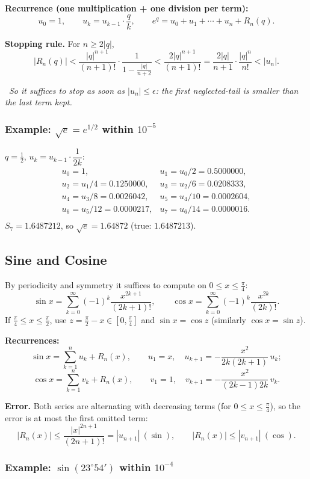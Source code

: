 \documentclass[hidelinks]{article}
\newcommand{\callout}[1]{\par\smallskip\noindent{\color{capri}$\blacktriangleright$}\ \textit{#1}\par\smallskip}
\newcommand{\abs}[1]{\left|#1\right|}
\begin{document}
\textbf{Recurrence (one multiplication + one division per term):}
\[
u_0=1,\qquad u_k=u_{k-1}\cdot\frac qk,\qquad e^q=u_0+u_1+\cdots+u_n+R_n(q).
\]

\textbf{Stopping rule.} For $n\ge2\abs q$,
\[
\abs{R_n(q)}<\frac{\abs q^{n+1}}{(n+1)!}\cdot\frac1{1-\frac{\abs q}{n+2}}<\frac{2\abs q^{n+1}}{(n+1)!}=\frac{2\abs q}{n+1}\cdot\frac{\abs q^n}{n!}<\abs{u_n}.
\]
\callout{So it suffices to stop as soon as $\abs{u_n}\le\epsilon$: the first neglected-tail is smaller than the last term kept.}

\subsubsection{Example: $\sqrt e=e^{1/2}$ within $10^{-5}$}

$q=\tfrac12$, $u_k=u_{k-1}\cdot\dfrac{1}{2k}$:
\[
\begin{array}{ll}
u_0=1, & u_1=u_0/2=0.5000000,\\
u_2=u_1/4=0.1250000, & u_3=u_2/6=0.0208333,\\
u_4=u_3/8=0.0026042, & u_5=u_4/10=0.0002604,\\
u_6=u_5/12=0.0000217, & u_7=u_6/14=0.0000016.\\
\end{array}
\]
$S_7=1.6487212$, so $\sqrt e=1.64872$ (true: $1.6487213$).

\subsection{Sine and Cosine}

By periodicity and symmetry it suffices to compute on $0\le x\le\frac\pi4$:
\[
\sin x=\sum_{k=0}^\infty(-1)^k\frac{x^{2k+1}}{(2k+1)!},\qquad
\cos x=\sum_{k=0}^\infty(-1)^k\frac{x^{2k}}{(2k)!}.
\]
If $\frac\pi4\le x\le\frac\pi2$, use $z=\frac\pi2-x\in[0,\frac\pi4]$ and $\sin x=\cos z$ (similarly $\cos x=\sin z$).

\textbf{Recurrences:}
\[
\sin x=\sum_{k=1}^n u_k+R_n(x),\qquad u_1=x,\quad u_{k+1}=-\frac{x^2}{2k(2k+1)}\,u_k ;
\]
\[
\cos x=\sum_{k=1}^n v_k+R_n(x),\qquad v_1=1,\quad v_{k+1}=-\frac{x^2}{(2k-1)2k}\,v_k .
\]

\textbf{Error.} Both series are alternating with decreasing terms (for $0\le x\le\frac\pi4$), so the error is at most the first omitted term:
\[
\abs{R_n(x)}\le\frac{\abs x^{2n+1}}{(2n+1)!}=\abs{u_{n+1}}\ (\sin),\qquad \abs{R_n(x)}\le\abs{v_{n+1}}\ (\cos).
\]

\subsubsection{Example: $\sin(23^\circ54')$ within $10^{-4}$}
\end{document}
